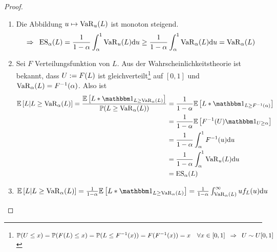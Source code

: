 \begin{proof}
	\begin{enumerate}[label=(zu \alph*), leftmargin=*]
		\item Die Abbildung $u \mapsto \operatorname{VaR}_u(L)$ ist monoton steigend. 
		\begin{equation*}
			\enskip \Rightarrow \enskip \operatorname{ES}_\alpha(L) = \frac{1}{1-\alpha} \int_\alpha^1 \operatorname{VaR}_u(L) \mathrm{d}{u} \ge \frac{1}{1-\alpha} \int_\alpha^1 \operatorname{VaR}_\alpha(L) \mathrm{d}{u} = \operatorname{VaR}_\alpha(L)
		\end{equation*}
		\item Sei $F$ Verteilungsfunktion von $L$. Aus der Wahrscheinlichkeitstheorie ist bekannt, dass $U \mathrel{:=} F(L)$ ist gleichverteilt\footnote{$\mathbb{P}(U \le x) = \mathbb{P}(F(L) \le x) = \mathbb{P}(L \le F^{-1}(x)) = F(F^{-1}(x)) = x \quad \forall x \in [0,1] \enskip \Rightarrow \enskip U \sim U[0,1]$} auf $[0,1]$ und $\operatorname{VaR}_\alpha(L) = F^{-1}(\alpha)$. Also ist 
		\begin{equation*}
		\begin{aligned}
			\EW[L | L \ge \VaR_\alpha(L)] 
			= \frac{\EW[L * \one_{L \ge \VaR_\alpha(L)}]}{\P(L \ge \VaR_\alpha(L))} 
			&= \frac{1}{1-\alpha} \EW[L * \one_{L \ge F^{-1}(\alpha)}] \\
			&= \frac{1}{1-\alpha} \EW[F^{-1}(U) \one_{U \ge \alpha}] \\
			&= \frac{1}{1-\alpha} \int_\alpha^1 F^{-1}(u) \diff{u} \\
			&= \frac{1}{1-\alpha} \int_\alpha^1 \VaR_u(L) \diff{u} \\
			&= \ES_\alpha(L)
		\end{aligned}
		\end{equation*}
		\item $\EW[L | L \ge \VaR_\alpha(L)] = \frac{1}{1-\alpha} \EW[L * \one_{L \ge \VaR_\alpha(L)}] = \frac{1}{1-\alpha} \int_{\VaR_\alpha(L)}^\infty u f_L(u) \diff{u}$
	\end{enumerate}
\end{proof}

